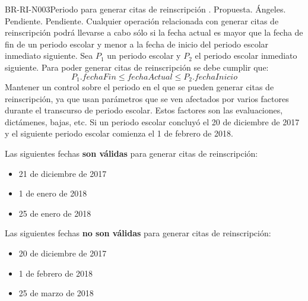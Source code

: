 \begin{BusinessRule}{BR-RI-N003}{Periodo para generar citas de reinscripción}
	{\bcAutorization}    %
	{\btEnabler}     %
	{\blControlling}    %
	.
	\BRItem[Estado] Propuesta.
	 Ángeles.
	 Pendiente.
	 Pendiente.
	\BRItem[Descripción] Cualquier operación relacionada con generar citas de reinscripción podrá llevarse a cabo sólo si la fecha actual es mayor que la fecha de fin de un periodo escolar y menor a la fecha de inicio del periodo escolar inmediato siguiente.
	\BRItem[Sentencia] Sea $P_1$ un periodo escolar y $P_2$ el periodo escolar inmediato siguiente. Para poder generar citas de reinscripción se debe cumplir que:
	$$ 	P_1.fechaFin \leq fechaActual \leq P_2.fechaInicio	$$
	\BRItem[Motivación] Mantener un control sobre el periodo en el que se pueden generar citas de reinscripción, ya que usan parámetros que se ven afectados por varios factores durante el transcurso de periodo escolar. Estos factores son las evaluaciones, dictámenes, bajas, etc.
	\BRItem[Ejemplo:] Si un periodo escolar concluyó el 20 de diciembre de 2017 y el siguiente periodo escolar comienza el 1 de febrero de 2018.
	
	Las siguientes fechas \textbf{son válidas} para generar citas de reinscripción:
	\begin{itemize}
		\item 21 de diciembre de 2017
		\item 1 de enero de 2018
		\item 25 de enero de 2018
	\end{itemize}
	Las siguientes fechas \textbf{no son válidas} para generar citas de reinscripción:
	\begin{itemize}
		\item 20 de diciembre de 2017
		\item 1 de febrero de 2018
		\item 25 de marzo de 2018
	\end{itemize}
	
\end{BusinessRule}

